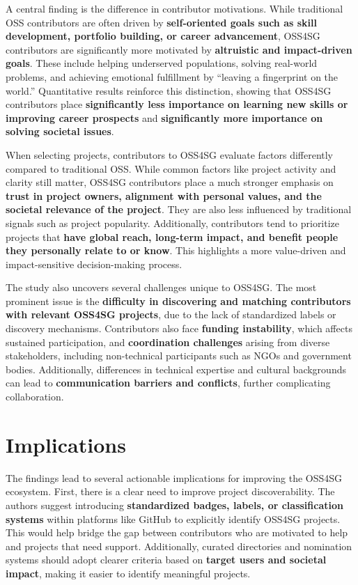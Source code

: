 A central finding is the difference in contributor motivations. While traditional OSS contributors are often driven by \textbf{self-oriented goals such as skill development, portfolio building, or career advancement}, OSS4SG contributors are significantly more motivated by \textbf{altruistic and impact-driven goals}. These include helping underserved populations, solving real-world problems, and achieving emotional fulfillment by “leaving a fingerprint on the world.” Quantitative results reinforce this distinction, showing that OSS4SG contributors place \textbf{significantly less importance on learning new skills or improving career prospects} and \textbf{significantly more importance on solving societal issues}.

When selecting projects, contributors to OSS4SG evaluate factors differently compared to traditional OSS. While common factors like project activity and clarity still matter, OSS4SG contributors place a much stronger emphasis on \textbf{trust in project owners, alignment with personal values, and the societal relevance of the project}. They are also less influenced by traditional signals such as project popularity. Additionally, contributors tend to prioritize projects that \textbf{have global reach, long-term impact, and benefit people they personally relate to or know}. This highlights a more value-driven and impact-sensitive decision-making process.

The study also uncovers several challenges unique to OSS4SG. The most prominent issue is the \textbf{difficulty in discovering and matching contributors with relevant OSS4SG projects}, due to the lack of standardized labels or discovery mechanisms. Contributors also face \textbf{funding instability}, which affects sustained participation, and \textbf{coordination challenges} arising from diverse stakeholders, including non-technical participants such as NGOs and government bodies. Additionally, differences in technical expertise and cultural backgrounds can lead to \textbf{communication barriers and conflicts}, further complicating collaboration.

\section{Implications}

The findings lead to several actionable implications for improving the OSS4SG ecosystem. First, there is a clear need to improve project discoverability. The authors suggest introducing \textbf{standardized badges, labels, or classification systems} within platforms like GitHub to explicitly identify OSS4SG projects. This would help bridge the gap between contributors who are motivated to help and projects that need support. Additionally, curated directories and nomination systems should adopt clearer criteria based on \textbf{target users and societal impact}, making it easier to identify meaningful projects.

